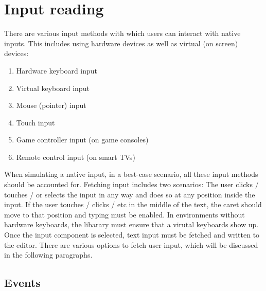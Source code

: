 

\section{Input reading}

There are various input methods with which users can interact with native inputs. This includes using hardware devices as well as virtual (on screen) devices:

\begin{enumerate} 
\item Hardware keyboard input
\item Virtual keyboard input
\item Mouse (pointer) input
\item Touch input
\item Game controller input (on game consoles)
\item Remote control input (on smart TVs)
\end{enumerate}

When simulating a native input, in a best-case scenario, all these input methods should be accounted for. Fetching input includes two scenarios: The user clicks / touches / or selects the input in any way and does so at any position inside the input. If the user touches / clicks / etc in the middle of the text, the caret should move to that position and typing must be enabled. In environments without hardware keyboards, the libarary must ensure that a virutal keyboards show up. Once the input component is selected, text input must be fetched and written to the editor. There are various options to fetch user input, which will be discussed in the following paragraphs.

\subsection{Events} 

